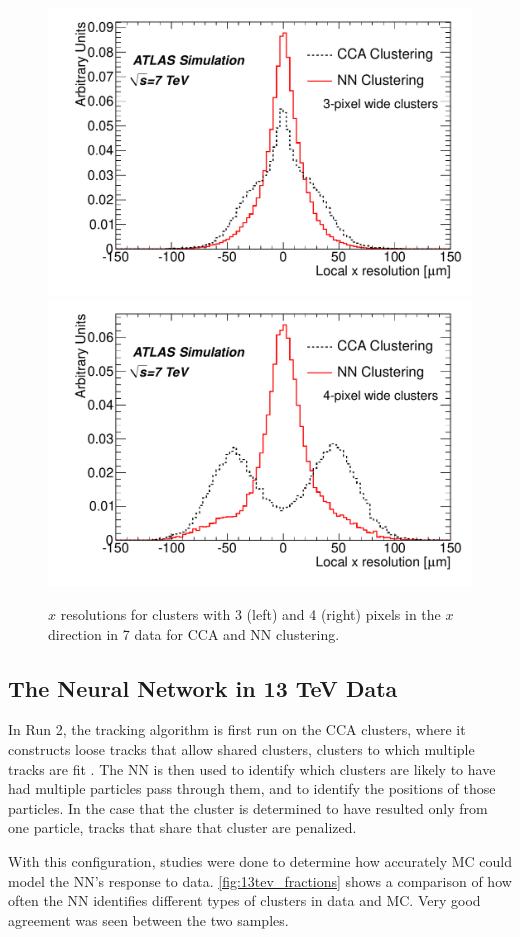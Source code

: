 \begin{centering}
\begin{figure}[bth]
\myfloatalign
\includegraphics[width=.45\linewidth]{figures/nn/3x_res.pdf}
\includegraphics[width=.45\linewidth]{figures/nn/4x_res.pdf}
\caption{$x$ resolutions for clusters with 3 (left) and 4 (right) pixels in the $x$ direction in 7 \tev data for \ac{CCA} and \ac{NN} clustering.}
\label{fig:7tev_res}
\end{figure}
\end{centering}

\subsection{The Neural Network in 13 TeV Data}

In Run 2, the tracking algorithm is first run on the \ac{CCA} clusters, where it constructs loose tracks that allow shared clusters, clusters to which multiple tracks are fit \cite{ATL-PHYS-PUB-2015-044}. The \ac{NN} is then used to identify which clusters are likely to have had multiple particles pass through them, and to identify the positions of those particles. In the case that the cluster is determined to have resulted only from one particle, tracks that share that cluster are penalized. 

With this configuration, studies were done to determine how accurately \ac{MC} could model the \ac{NN}'s response to data. \autoref{fig:13tev_fractions} shows a comparison of how often the \ac{NN} identifies different types of clusters in data and \ac{MC}. Very good agreement was seen between the two samples.

